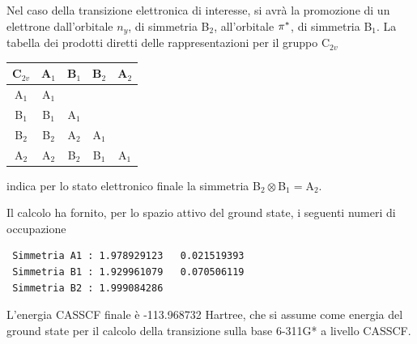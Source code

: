 Nel caso della transizione elettronica di interesse, si avr\`a la promozione
di un elettrone dall'orbitale $n_y$, di simmetria B$_2$, all'orbitale $\pi^{*}$,
di simmetria B$_1$. La tabella dei prodotti diretti delle rappresentazioni
per il gruppo C$_{2v}$ 
\begin{center}
\begin{tabular}{|c|cccc|}
\hline
 C$_{2v}$ & A$_1$ & B$_1$ & B$_2$ & A$_2$ \\
\hline                                
    A$_1$ & A$_1$ &       &       &        \\
    B$_1$ & B$_1$ & A$_1$ &       &        \\
    B$_2$ & B$_2$ & A$_2$ & A$_1$ &        \\
    A$_2$ & A$_2$ & B$_2$ & B$_1$ & A$_1$  \\
\hline
\end{tabular}
\end{center}
indica per lo stato elettronico finale la simmetria B$_2 \otimes $B$_1 = $A$_2 $.

Il calcolo ha fornito, per lo spazio attivo del ground state, i seguenti numeri
di occupazione
\begin{verbatim}
 Simmetria A1 : 1.978929123   0.021519393
 Simmetria B1 : 1.929961079   0.070506119
 Simmetria B2 : 1.999084286
\end{verbatim}

L'energia CASSCF finale \`e -113.968732 Hartree, che si assume come energia
del ground state per il calcolo della transizione sulla base 6-311G*
a livello CASSCF.


